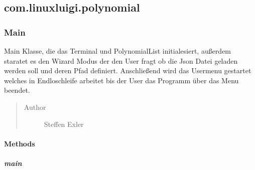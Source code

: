 \documentclass[letterpaper,10pt,ngerman]{sphinxmanual}
\begin{document}
\subsection{com.linuxluigi.polynomial}
\label{com/linuxluigi/polynomial/package-index:com-linuxluigi-polynomial}\label{com/linuxluigi/polynomial/package-index::doc}\label{com/linuxluigi/polynomial/package-index:package-com.linuxluigi.polynomial}

\subsubsection{Main}
\label{com/linuxluigi/polynomial/Main::doc}\label{com/linuxluigi/polynomial/Main:main}

\begin{fulllineitems}
\label{com/linuxluigi/polynomial/Main:com.linuxluigi.polynomial.Main}
Main Klasse, die das Terminal und PolynomialList initialesiert, außerdem staratet es den Wizard Modus der den User fragt ob die Json Datei geladen werden soll und deren Pfad definiert. Anschließend wird das Usermenu gestartet welches in Endloschleife arbeitet bis der User das Programm über das Menu beendet.
\begin{quote}\begin{description}
\item[{Author}] \leavevmode
Steffen Exler

\end{description}\end{quote}

\end{fulllineitems}



\paragraph{Methods}
\label{com/linuxluigi/polynomial/Main:methods}

\subparagraph{main}
\label{com/linuxluigi/polynomial/Main:id1}
\end{document}
